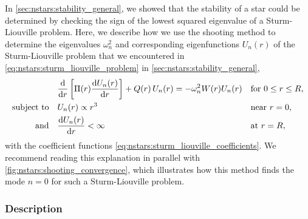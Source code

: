 In \cref{sec:nstars:stability_general}, we showed that the stability of a star could be determined by checking the sign of the lowest squared eigenvalue of a Sturm-Liouville problem.
Here, we describe how we use the shooting method to determine the eigenvalues $\omega_n^2$ and corresponding eigenfunctions $U_n(r)$ of the Sturm-Liouville problem that we encountered in \cref{eq:nstars:sturm_liouville_problem} in \cref{sec:nstars:stability_general},
\begin{subequations}
\begin{align}
	&\odv*{ \left[ \Pi(r) \odv{U_n(r)}{r} \right] }{r} + Q(r) \, U_n(r) = -\omega_n^2 W(r) U_n(r) && \text{for } 0 \leq r \leq R , \label{eq:shooting:sturm_liouville_diffeq} \\
	\text{subject to} \quad & U_n(r)          \propto r^3    && \text{near } r=0 , \label{eq:shooting:sturm_liouville_bc1} \\
	\text{and}        \quad & \odv{U_n(r)}{r} <       \infty && \text{at } r=R , \label{eq:shooting:sturm_liouville_bc2}
\end{align}%
\label{eq:shooting:sturm_liouville_problem}%
\end{subequations}%
with the coefficient functions \eqref{eq:nstars:sturm_liouville_coefficients}.
We recommend reading this explanation in parallel with \cref{fig:nstars:shooting_convergence}, which illustrates how this method finds the mode $n=0$ for such a Sturm-Liouville problem.

\subsubsection{Description}
\label{sec:numerics:shooting_method_description}

